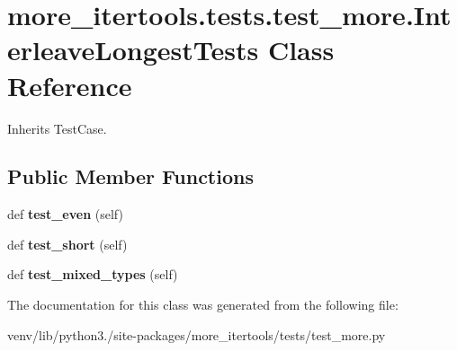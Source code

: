 \hypertarget{classmore__itertools_1_1tests_1_1test__more_1_1_interleave_longest_tests}{}\section{more\+\_\+itertools.\+tests.\+test\+\_\+more.\+Interleave\+Longest\+Tests Class Reference}
\label{classmore__itertools_1_1tests_1_1test__more_1_1_interleave_longest_tests}


Inherits Test\+Case.

\subsection*{Public Member Functions}
\begin{DoxyCompactItemize}
\item 
\mbox{\label{classmore__itertools_1_1tests_1_1test__more_1_1_interleave_longest_tests_ac08f2cfff95e84b08c6ad2cfc26b6ea0}} 
def {\bfseries test\+\_\+even} (self)
\item 
\mbox{\label{classmore__itertools_1_1tests_1_1test__more_1_1_interleave_longest_tests_a01c0ef26ca9bfb5456aff0dacee9fb0b}} 
def {\bfseries test\+\_\+short} (self)
\item 
\mbox{\label{classmore__itertools_1_1tests_1_1test__more_1_1_interleave_longest_tests_ada29ea22dc643c8dc1e0566230b885c5}} 
def {\bfseries test\+\_\+mixed\+\_\+types} (self)
\end{DoxyCompactItemize}


The documentation for this class was generated from the following file\+:\begin{DoxyCompactItemize}
\item 
venv/lib/python3./site-\/packages/more\+\_\+itertools/tests/test\+\_\+more.\+py\end{DoxyCompactItemize}

